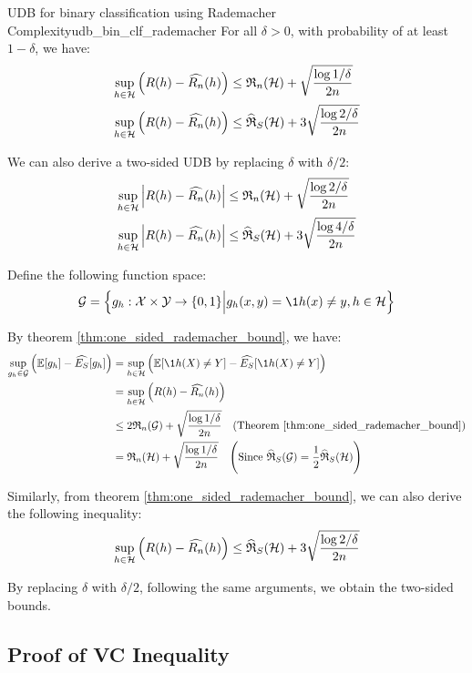 \begin{corollary}{UDB for binary classification using Rademacher Complexity}{udb_bin_clf_rademacher}
    For all $\delta>0$, with probability of at least $1-\delta$, we have:
    \begin{align*}
        \sup_{h\in\mathcal{H}} \Big( 
            R(h) - \widehat{R_n}(h)
         \Big) &\le \mathfrak{R}_n(\mathcal{H}) + \sqrt{
            \frac{\log 1/\delta}{2n}
        } \\
        \sup_{h\in\mathcal{H}} \Big( 
            R(h) - \widehat{R_n}(h)
         \Big) &\le \widehat{\mathfrak{R}}_S(\mathcal{H}) + 3\sqrt{
            \frac{\log 2/\delta}{2n}
        }
    \end{align*}

    \noindent We can also derive a two-sided UDB by replacing $\delta$ with $\delta/2$:
    \begin{align*}
        \sup_{h\in\mathcal{H}} \Big| 
            R(h) - \widehat{R_n}(h)
         \Big| &\le \mathfrak{R}_n(\mathcal{H}) + \sqrt{
            \frac{\log 2/\delta}{2n}
        } \\
        \sup_{h\in\mathcal{H}} \Big| 
            R(h) - \widehat{R_n}(h)
         \Big| &\le \widehat{\mathfrak{R}}_S(\mathcal{H}) + 3\sqrt{
            \frac{\log 4/\delta}{2n}
        }
    \end{align*}
\end{corollary}

\begin{proof*}
    Define the following function space:
    \begin{align*}
        \G = \bigCurl{
            g_h : \X \times \Y \to \{0,1\} \Big| g_h(x, y) = \1{h(x)\ne y}, h\in\Hf
        }
    \end{align*}

    \noindent By theorem \ref{thm:one_sided_rademacher_bound}, we have:
    \begin{align*}
        \sup_{g_h\in\G} \bigRound{\E[g_h] - \widehat{E_S}[g_h]}
            &= \sup_{h\in\Hf} \bigRound{\E[\1{h(X)\ne Y}] - \widehat{E_S}[\1{h(X)\ne Y}]} \\
            &= \sup_{h\in\Hf} \bigRound{R(h) - \widehat{R_n}(h)} \\
            &\le 2\RC_n(\G) + \sqrt{\frac{\log 1/\delta}{2n}} \ \ \ (\text{Theorem \ref{thm:one_sided_rademacher_bound}}) \\
            &= \RC_n(\Hf) + \sqrt{\frac{\log 1/\delta}{2n}} \ \ \ \biggRound{
                \text{Since } \ERC_S(\G) = \frac{1}{2}\ERC_S(\Hf)
            }
    \end{align*}

    \noindent Similarly, from theorem \ref{thm:one_sided_rademacher_bound}, we can also derive the following inequality:
    \begin{align*}
        \sup_{h\in\mathcal{H}} \Big( R(h) - \widehat{R_n}(h) \Big) \le \widehat{\mathfrak{R}}_S(\mathcal{H}) + 3\sqrt{\frac{\log 2/\delta}{2n}}
    \end{align*}

    \noindent By replacing $\delta$ with $\delta/2$, following the same arguments, we obtain the two-sided bounds.
\end{proof*}


\subsection{Proof of VC Inequality}
\label{sec:proof_of_vc_inequality}
